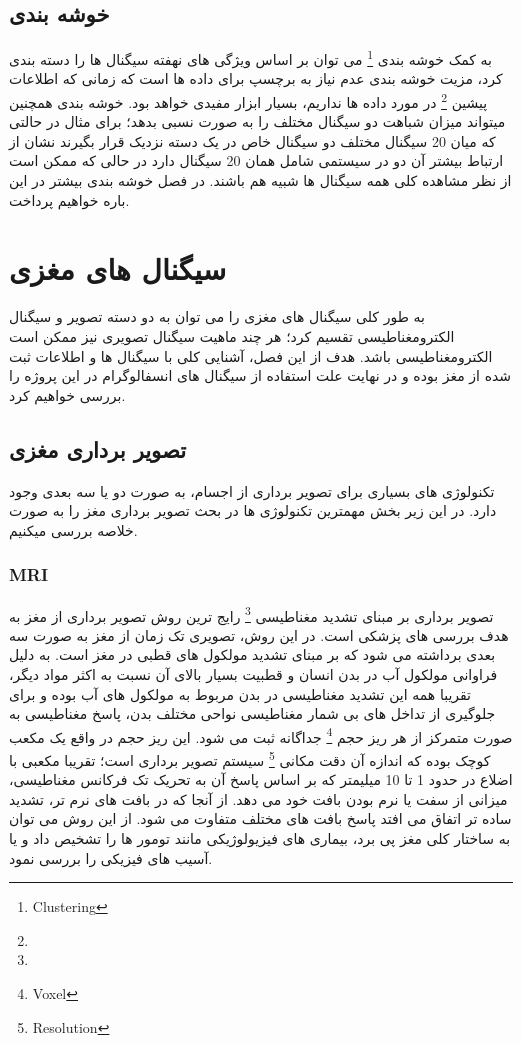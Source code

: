 \documentclass[11pt]{extarticle}
\begin{document}
\subsection{خوشه بندی}
به کمک خوشه بندی 
\footnote{Clustering}
می توان بر اساس ویژگی های نهفته سیگنال ها را دسته بندی کرد، مزیت خوشه بندی عدم نیاز به برچسپ برای داده ها است که زمانی که اطلاعات پیشین
\footnote{}
در مورد داده ها نداریم، بسیار ابزار مفیدی خواهد بود. خوشه بندی همچنین میتواند میزان شباهت دو سیگنال مختلف را به صورت نسبی بدهد؛ برای مثال در حالتی که میان 20 سیگنال مختلف دو سیگنال خاص در یک دسته نزدیک قرار بگیرند نشان از ارتباط بیشتر آن دو در سیستمی شامل همان 20 سیگنال دارد در حالی که ممکن است از نظر مشاهده کلی همه سیگنال ها شبیه هم باشند. در فصل خوشه بندی بیشتر در این باره خواهیم پرداخت.

\clearpage
\newpage
\section{سیگنال های مغزی}
به طور کلی سیگنال های مغزی را می توان به دو دسته تصویر و سیگنال الکترومغناطیسی تقسیم کرد؛ هر چند ماهیت سیگنال تصویری نیز ممکن است الکترومغناطیسی باشد. هدف از این فصل، آشنایی کلی با سیگنال ها و اطلاعات ثبت شده از مغز بوده و در نهایت علت استفاده از سیگنال های انسفالوگرام در این پروژه را بررسی خواهیم کرد.

\subsection{تصویر برداری مغزی}
تکنولوژی های بسیاری برای تصویر برداری از اجسام، به صورت دو یا سه بعدی وجود دارد. در این زیر بخش مهمترین تکنولوژی ها در بحث تصویر برداری مغز را به صورت خلاصه بررسی میکنیم.
\subsubsection{MRI}
تصویر برداری بر مبنای تشدید مغناطیسی 
\footnote{}
رایج ترین روش تصویر برداری از مغز به هدف بررسی های پزشکی است. در این روش، تصویری تک زمان از مغز به صورت سه بعدی برداشته می شود که بر مبنای تشدید مولکول های قطبی در مغز است. به دلیل فراوانی مولکول آب در بدن انسان و قطبیت بسیار بالای آن نسبت به اکثر مواد دیگر، تقریبا همه این تشدید مغناطیسی در بدن مربوط به مولکول های آب بوده و برای جلوگیری از تداخل های بی شمار مغناطیسی نواحی مختلف بدن، پاسخ مغناطیسی به صورت متمرکز از هر ریز حجم 
\footnote{Voxel}
جداگانه ثبت می شود. این ریز حجم در واقع یک مکعب کوچک بوده که اندازه آن دقت مکانی
\footnote{Resolution}
سیستم تصویر برداری است؛ تقریبا مکعبی با اضلاع در حدود 1 تا 10 میلیمتر که بر اساس پاسخ آن به تحریک تک فرکانس مغناطیسی، میزانی از سفت یا نرم بودن بافت خود می دهد.
از آنجا که در بافت های نرم تر، تشدید ساده تر اتفاق می افتد پاسخ بافت های مختلف متفاوت می شود. از این روش می توان به ساختار کلی مغز پی برد، بیماری های فیزیولوژیکی مانند تومور ها را تشخیص داد و یا آسیب های فیزیکی را بررسی نمود.
\end{document}
